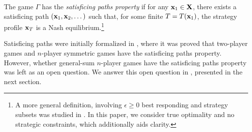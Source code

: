 \begin{definition}
    The game $\Gamma$ has the \emph{satisficing paths property} if for any ${\mathbf{x}}_1 \in {\mathbf{X}}$, there exists a satisficing path $({\mathbf{x}}_1, {\mathbf{x}}_2, \dots )$ such that, for some finite $T = T({\mathbf{x}}_1 )$, the strategy profile ${\mathbf{x}}_{T}$ is a Nash equilibrium.\footnote{A more general definition, involving $\epsilon \geq 0$ best responding and strategy subsets was studied in \cite{yongacoglu2023satisficing}. In this paper, we consider true optimality and no strategic constraints, which additionally aids clarity.}
\end{definition}



Satisficing paths were initially formalized in \cite{yongacoglu2023satisficing}, where it was proved that two-player games and $n$-player symmetric games have the satisficing paths property. However, whether general-sum $n$-player games have the satisficing paths property was left as an open question. We answer this open question in , presented in the next section. 